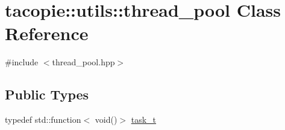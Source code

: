 \hypertarget{classtacopie_1_1utils_1_1thread__pool}{}\section{tacopie\+:\+:utils\+:\+:thread\+\_\+pool Class Reference}
\label{classtacopie_1_1utils_1_1thread__pool}


{\ttfamily \#include $<$thread\+\_\+pool.\+hpp$>$}

\subsection*{Public Types}
\begin{DoxyCompactItemize}
\item 
typedef std\+::function$<$ void()$>$ \hyperlink{classtacopie_1_1utils_1_1thread__pool_a8ae8886fdeaa8e5c0abad12626a47296}{task\+\_\+t}
\end{DoxyCompactItemize}
